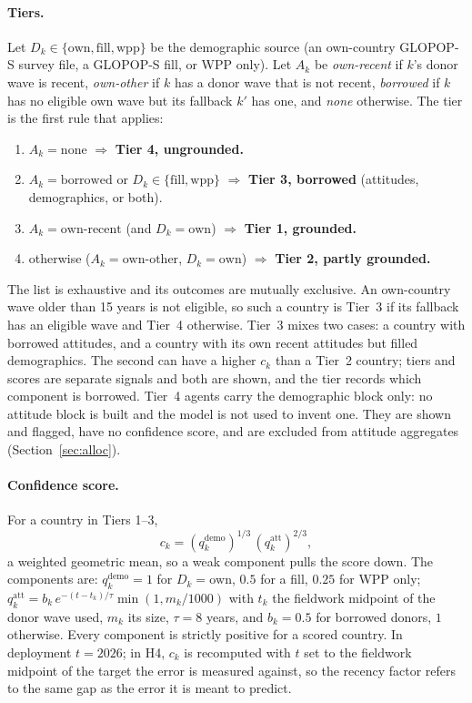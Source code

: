 \documentclass[10pt]{article}
\begin{document}
\paragraph{Tiers.} Let $D_k \in \{\text{own}, \text{fill}, \text{wpp}\}$ be the demographic source (an own-country GLOPOP-S survey file, a GLOPOP-S fill, or WPP only). Let $A_k$ be \emph{own-recent} if $k$'s donor wave is recent, \emph{own-other} if $k$ has a donor wave that is not recent, \emph{borrowed} if $k$ has no eligible own wave but its fallback $k'$ has one, and \emph{none} otherwise. The tier is the first rule that applies:
\begin{enumerate}
  \item $A_k = \text{none}$ $\Rightarrow$ \textbf{Tier 4, ungrounded.}
  \item $A_k = \text{borrowed}$ or $D_k \in \{\text{fill}, \text{wpp}\}$ $\Rightarrow$ \textbf{Tier 3, borrowed} (attitudes, demographics, or both).
  \item $A_k = \text{own-recent}$ (and $D_k = \text{own}$) $\Rightarrow$ \textbf{Tier 1, grounded.}
  \item otherwise ($A_k = \text{own-other}$, $D_k = \text{own}$) $\Rightarrow$ \textbf{Tier 2, partly grounded.}
\end{enumerate}
The list is exhaustive and its outcomes are mutually exclusive. An own-country wave older than 15 years is not eligible, so such a country is Tier~3 if its fallback has an eligible wave and Tier~4 otherwise. Tier~3 mixes two cases: a country with borrowed attitudes, and a country with its own recent attitudes but filled demographics. The second can have a higher $c_k$ than a Tier~2 country; tiers and scores are separate signals and both are shown, and the tier records which component is borrowed. Tier~4 agents carry the demographic block only: no attitude block is built and the model is not used to invent one. They are shown and flagged, have no confidence score, and are excluded from attitude aggregates (Section~\ref{sec:alloc}).

\paragraph{Confidence score.} For a country in Tiers 1--3,
\begin{equation}
c_k = (q^{\text{demo}}_k)^{1/3}\,(q^{\text{att}}_k)^{2/3},
\end{equation}
a weighted geometric mean, so a weak component pulls the score down. The components are:
$q^{\text{demo}}_k = 1$ for $D_k=\text{own}$, $0.5$ for a fill, $0.25$ for WPP only;
$q^{\text{att}}_k = b_k\, e^{-(t-t_k)/\tau}\min(1, m_k/1000)$ with $t_k$ the fieldwork midpoint of the donor wave used, $m_k$ its size, $\tau = 8$ years, and $b_k = 0.5$ for borrowed donors, $1$ otherwise. Every component is strictly positive for a scored country. In deployment $t = 2026$; in H4, $c_k$ is recomputed with $t$ set to the fieldwork midpoint of the target the error is measured against, so the recency factor refers to the same gap as the error it is meant to predict.
\end{document}
